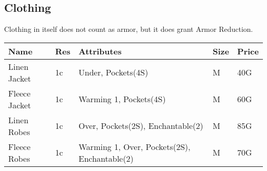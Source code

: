 \subsection{Clothing}\label{subsec:clothing}

Clothing in itself does not count as armor, but it does grant Armor Reduction.


\begin{longtable}{p{3cm} | p{1.5cm} | p{5cm} | p{1cm} | p{1.5cm}}
	Name & Res &   Attributes & Size & Price\\ \hline
	Linen Jacket & 1c & Under, Pockets(4S) & M & 40G\\
	
	Fleece Jacket & 1c & Warming 1, Pockets(4S) & M & 60G\\
	
	Linen Robes & 1c & Over, Pockets(2S), Enchantable(2) & M & 85G\\
	
	Fleece Robes & 1c & Warming 1, Over, Pockets(2S), Enchantable(2)  & M & 70G\\
\end{longtable}
